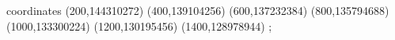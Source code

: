 \begin{axis}[
	xlabel={\Huge{minsup}},
	ylabel={\Huge{memoryUSS}},
	xmin=200, xmax=1400,
\addplot+  [red]
	coordinates {
(200,144310272)
(400,139104256)
(600,137232384)
(800,135794688)
(1000,133300224)
(1200,130195456)
(1400,128978944)
	};   
\end{axis}